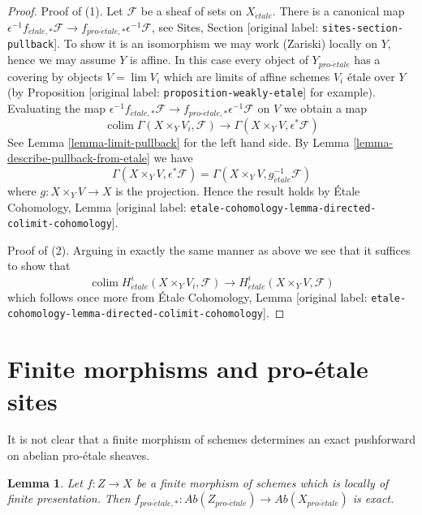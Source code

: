 \documentclass[10pt,a4paper]{article}
\theoremstyle{plain}
\newtheorem{lemma}[subsection]{Lemma}
\theoremstyle{definition}
\theoremstyle{remark}
\numberwithin{equation}{subsection}
\def\lim{\mathop{\mathrm{lim}}\nolimits}
\def\colim{\mathop{\mathrm{colim}}\nolimits}
\def\proetale{{pro\text{-}\acute{e}tale}}
\def\etale{{\acute{e}tale}}
\begin{document}
\begin{proof}
Proof of (1). Let $\mathcal{F}$ be a sheaf of sets on $X_\etale$. There
is a canonical map $\epsilon^{-1}f_{\etale, *}\mathcal{F} \to
f_{\proetale, *}\epsilon^{-1}\mathcal{F}$, see
Sites, Section [original label: \nolinkurl{sites-section-pullback}].
To show it is an isomorphism we may work (Zariski) locally on $Y$, hence
we may assume $Y$ is affine. In this case
every object of $Y_\proetale$ has a covering by objects $V = \lim V_i$
which are limits of affine schemes $V_i$ \'etale over $Y$ (by
Proposition [original label: \nolinkurl{proposition-weakly-etale}]
for example). Evaluating the map
$\epsilon^{-1}f_{\etale, *}\mathcal{F} \to
f_{\proetale, *}\epsilon^{-1}\mathcal{F}$
on $V$ we obtain a map
$$
\colim \Gamma(X \times_Y V_i, \mathcal{F})
\longrightarrow
\Gamma(X \times_Y V, \epsilon^*\mathcal{F})
$$
See Lemma \ref{lemma-limit-pullback} for the left hand side.
By Lemma \ref{lemma-describe-pullback-from-etale} we have
$$
\Gamma(X \times_Y V, \epsilon^*\mathcal{F}) =
\Gamma(X \times_Y V, g_\etale^{-1}\mathcal{F})
$$
where $g : X \times_Y V \to X$ is the projection. Hence the result holds by
\'Etale Cohomology, Lemma
[original label: \nolinkurl{etale-cohomology-lemma-directed-colimit-cohomology}].

\medskip\noindent
Proof of (2). Arguing in exactly the same manner as above
we see that it suffices to show that
$$
\colim H^i_\etale(X \times_Y V_i, \mathcal{F})
\longrightarrow
H^i_\etale(X \times_Y V, \mathcal{F})
$$
which follows once more from \'Etale Cohomology, Lemma
[original label: \nolinkurl{etale-cohomology-lemma-directed-colimit-cohomology}].
\end{proof}







\section{Finite morphisms and pro-\'etale sites}
\label{section-finite}

\noindent
It is not clear that a finite morphism of schemes determines
an exact pushforward on abelian pro-\'etale sheaves.

\begin{lemma}
\label{lemma-finite}
Let $f : Z \to X$ be a finite morphism of schemes which is
locally of finite presentation. Then
$f_{\proetale, *} : \textit{Ab}(Z_\proetale) \to \textit{Ab}(X_\proetale)$
is exact.
\end{lemma}
\end{document}
